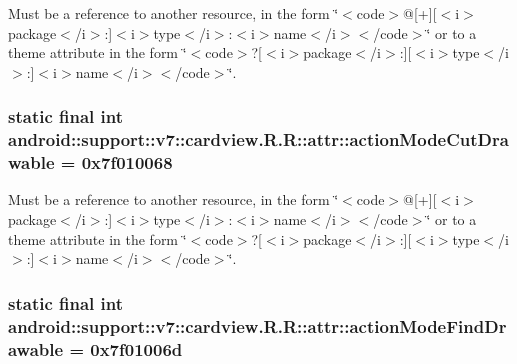 Must be a reference to another resource, in the form \char`\"{}$<$code$>$@\mbox{[}+\mbox{]}\mbox{[}$<$i$>$package$<$/i$>$:\mbox{]}$<$i$>$type$<$/i$>$:$<$i$>$name$<$/i$>$$<$/code$>$\char`\"{} or to a theme attribute in the form \char`\"{}$<$code$>$?\mbox{[}$<$i$>$package$<$/i$>$:\mbox{]}\mbox{[}$<$i$>$type$<$/i$>$:\mbox{]}$<$i$>$name$<$/i$>$$<$/code$>$\char`\"{}. \hypertarget{classandroid_1_1support_1_1v7_1_1cardview_1_1_r_1_1attr_e33c46bed2ca1f8f777a74b1d637663c}{
\subsubsection[{actionModeCutDrawable}]{\setlength{\rightskip}{0pt plus 5cm}static final int android::support::v7::cardview.R.R::attr::actionModeCutDrawable = 0x7f010068}}
\label{classandroid_1_1support_1_1v7_1_1cardview_1_1_r_1_1attr_e33c46bed2ca1f8f777a74b1d637663c}


Must be a reference to another resource, in the form \char`\"{}$<$code$>$@\mbox{[}+\mbox{]}\mbox{[}$<$i$>$package$<$/i$>$:\mbox{]}$<$i$>$type$<$/i$>$:$<$i$>$name$<$/i$>$$<$/code$>$\char`\"{} or to a theme attribute in the form \char`\"{}$<$code$>$?\mbox{[}$<$i$>$package$<$/i$>$:\mbox{]}\mbox{[}$<$i$>$type$<$/i$>$:\mbox{]}$<$i$>$name$<$/i$>$$<$/code$>$\char`\"{}. \hypertarget{classandroid_1_1support_1_1v7_1_1cardview_1_1_r_1_1attr_4ff81e263c3bb423b9d6ef2878587db8}{
\subsubsection[{actionModeFindDrawable}]{\setlength{\rightskip}{0pt plus 5cm}static final int android::support::v7::cardview.R.R::attr::actionModeFindDrawable = 0x7f01006d}}
\label{classandroid_1_1support_1_1v7_1_1cardview_1_1_r_1_1attr_4ff81e263c3bb423b9d6ef2878587db8}


